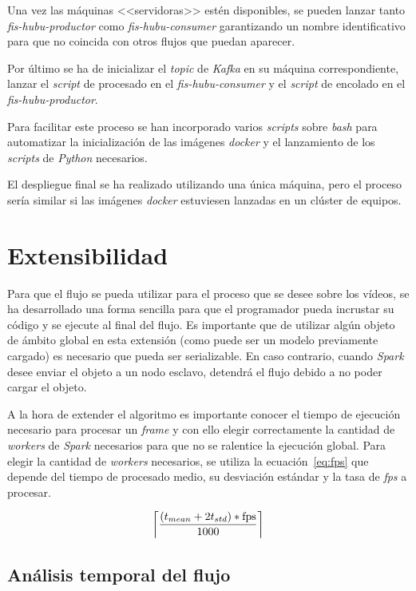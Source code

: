 Una vez las máquinas <<servidoras>> estén disponibles, se pueden lanzar tanto \textit{fis-hubu-productor} como \textit{fis-hubu-consumer} garantizando un nombre identificativo para que no coincida con otros flujos que puedan aparecer.

Por último se ha de inicializar el \textit{topic} de \textit{Kafka} en su máquina correspondiente, lanzar el \textit{script} de procesado en el \textit{fis-hubu-consumer} y el \textit{script} de encolado en el \textit{fis-hubu-productor}.

Para facilitar este proceso se han incorporado varios \textit{scripts} sobre \textit{bash} para automatizar la inicialización de las imágenes \textit{docker} y el lanzamiento de los \textit{scripts} de \textit{Python} necesarios.

El despliegue final se ha realizado utilizando una única máquina, pero el proceso sería similar si las imágenes \textit{docker} estuviesen lanzadas en un clúster de equipos.
  

\section{Extensibilidad}

Para que el flujo se pueda utilizar para el proceso que se desee sobre los vídeos, se ha desarrollado una forma sencilla para que el programador pueda incrustar su código y se ejecute al final del flujo. Es importante que de utilizar algún objeto de ámbito global en esta extensión (como puede ser un modelo previamente cargado) es necesario que pueda ser serializable. En caso contrario, cuando \textit{Spark} desee enviar el objeto a un nodo esclavo, detendrá el flujo debido a no poder cargar el objeto.

A la hora de extender el algoritmo es importante conocer el tiempo de ejecución necesario para procesar un \textit{frame} y con ello elegir correctamente la cantidad de \textit{workers} de \textit{Spark} necesarios para que no se ralentice la ejecución global. Para elegir la cantidad de \textit{workers} necesarios, se utiliza la ecuación~\ref{eq:fps} que depende del tiempo de procesado medio, su desviación estándar y la tasa de \textit{fps} a procesar.

\begin{equation}\label{eq:fps}
\left \lceil \frac{(t_{mean}+2t_{std})*\textrm{fps}}{1000} \right \rceil
\end{equation}

\subsection{Análisis temporal del flujo}\label{sec:analisistemporal_flujo}

